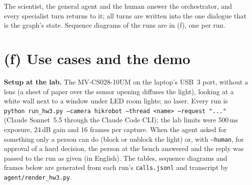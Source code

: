 \documentclass[11pt,a4paper]{article}
\begin{document}
\begin{center}
\end{center}
The scientist, the general agent and the human answer the orchestrator, and every specialist turn returns to it; all turns
are written into the one dialogue that is the graph's state. Sequence diagrams of the runs are in (f), one per run.

\section*{(f) Use cases and the demo}
\textbf{Setup at the lab.} The MV-CS028-10UM on the laptop's USB~3 port, without a lens (a sheet of paper over the
sensor opening diffuses the light), looking at a white wall next to a window under LED room lights; no laser. Every run is
\texttt{python run\_hw3.py --camera hikrobot --thread <name> --request "..."} (Claude Sonnet~5.5 through the Claude Code
CLI); the lab limits were 500\,ms exposure, 24\,dB gain and 16 frames per capture. When the agent asked for something
only a person can do (block or unblock the light) or, with \texttt{--human}, for approval of a hard decision, the person at
the bench answered and the reply was passed to the run as given (in English). The tables, sequence diagrams and frames
below are generated from each run's \texttt{calls.jsonl} and transcript by \texttt{agent/render\_hw3.py}.
\end{document}
